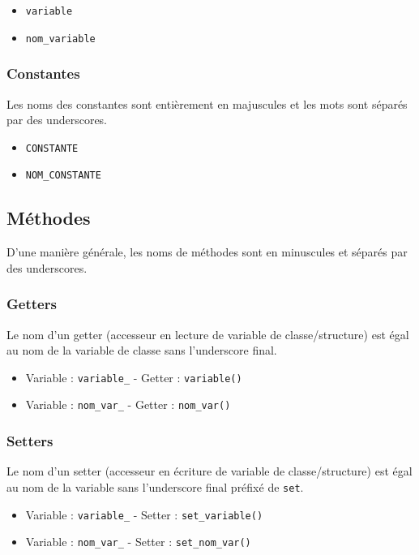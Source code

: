 \documentclass[]{article}
\begin{document}
\begin{itemize}
	\item \texttt{variable}
	\item \texttt{nom\_variable}
\end{itemize}

\subsubsection{Constantes}

Les noms des constantes sont entièrement en majuscules et les mots sont
séparés par des underscores.

\begin{itemize}
	\item \texttt{CONSTANTE}
	\item \texttt{NOM\_CONSTANTE}
\end{itemize}

\subsection{Méthodes}

D'une manière générale, les noms de méthodes sont en minuscules et
séparés par des underscores.

\subsubsection{Getters}

Le nom d'un getter (accesseur en lecture de variable de classe/structure)
est égal au nom de la variable de classe sans l'underscore final.

\begin{itemize}
	\item Variable : \texttt{variable\_} - Getter : \texttt{variable()}
	\item Variable : \texttt{nom\_var\_} - Getter : \texttt{nom\_var()}
\end{itemize}

\subsubsection{Setters}

Le nom d'un setter (accesseur en écriture de variable de classe/structure)
est égal au nom de la variable sans l'underscore final préfixé de \texttt{set}.

\begin{itemize}
	\item Variable : \texttt{variable\_} - Setter : \texttt{set\_variable()}
	\item Variable : \texttt{nom\_var\_} - Setter : \texttt{set\_nom\_var()}
\end{itemize}
\end{document}
